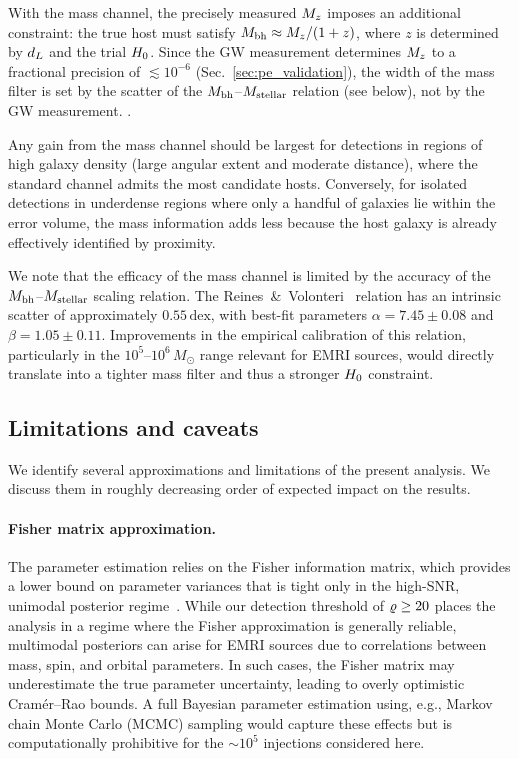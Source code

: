 With the mass channel, the precisely measured $M_z$ imposes an
additional constraint: the true host must satisfy
$M_\mathrm{bh} \approx M_z / (1+z)$, where $z$ is determined by $d_L$ and the
trial $H_0$.  Since the GW measurement determines $M_z$ to a fractional
precision of $\lesssim 10^{-6}$ (Sec.~\ref{sec:pe_validation}), the
width of the mass filter is set by the scatter of the
$M_\mathrm{bh}$--$M_\mathrm{stellar}$ relation (see below), not by the GW measurement.
.

Any gain from the mass channel should be largest for detections in regions of high galaxy
density (large angular extent and moderate distance), where the standard
channel admits the most candidate hosts.  Conversely, for isolated
detections in underdense regions where only a handful of galaxies lie
within the error volume, the mass information adds less because the host galaxy is already effectively
identified by proximity.

We note that the efficacy of the mass channel is limited by the accuracy
of the $M_\mathrm{bh}$--$M_\mathrm{stellar}$ scaling relation.  The
Reines~\&~Volonteri~\cite{Reines:2015moa} relation has an intrinsic
scatter of approximately $0.55\,\mathrm{dex}$, with best-fit parameters
$\alpha = 7.45 \pm 0.08$ and $\beta = 1.05 \pm 0.11$.  Improvements in
the empirical calibration of this relation, particularly in the
$10^5$--$10^6\,M_\odot$ range relevant for EMRI sources, would directly
translate into a tighter mass filter and thus a stronger $H_0$
constraint.

\subsection{Limitations and caveats}
\label{sec:caveats}

We identify several approximations and limitations of the present
analysis.  We discuss them in roughly decreasing order of expected
impact on the results.

\paragraph{Fisher matrix approximation.}
The parameter estimation relies on the Fisher information matrix, which
provides a lower bound on parameter variances that is tight only in the
high-SNR, unimodal posterior regime~\cite{Vallisneri:2007ev}.  While our
detection threshold of $\varrho \geq 20$ places the analysis in a regime
where the Fisher approximation is generally reliable, multimodal
posteriors can arise for EMRI sources due to correlations between mass,
spin, and orbital parameters.  In such cases, the Fisher matrix may
underestimate the true parameter uncertainty, leading to overly
optimistic Cram\'{e}r--Rao bounds.  A full Bayesian parameter estimation
using, e.g., Markov chain Monte Carlo (MCMC) sampling would capture
these effects but is computationally prohibitive for the $\sim 10^5$
injections considered here.

